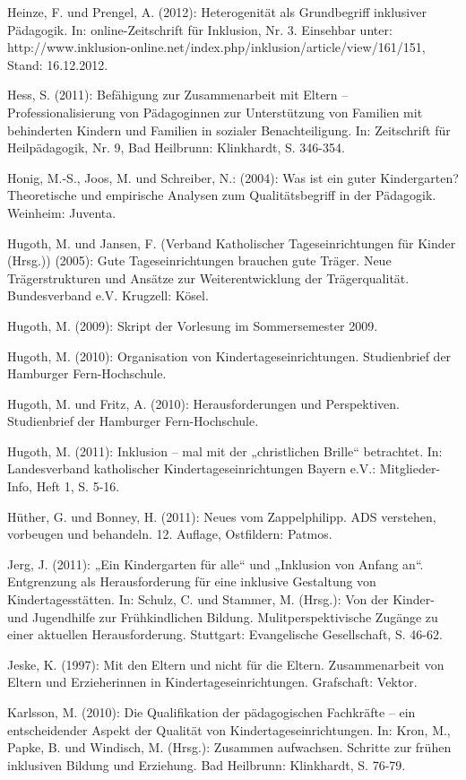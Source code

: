 Heinze, F. und Prengel, A. (2012): Heterogenität als Grundbegriff inklusiver Pädagogik. In: online-Zeitschrift für Inklusion, Nr. 3. Einsehbar unter: http://www.inklusion-online.net/index.php/inklusion/article/view/161/151, Stand: 16.12.2012.


Hess, S. (2011): Befähigung zur Zusammenarbeit mit Eltern -- Professionalisierung von Pädagoginnen zur Unterstützung von Familien mit behinderten Kindern und Familien in sozialer Benachteiligung. In: Zeitschrift für Heilpädagogik, Nr. 9, Bad Heilbrunn: Klinkhardt, S. 346-354.  

Honig, M.-S., Joos, M. und Schreiber, N.: (2004): Was ist ein guter Kindergarten? Theoretische und empirische Analysen zum Qualitätsbegriff in der Pädagogik. Weinheim: Juventa.

Hugoth, M. und Jansen, F. (Verband Katholischer Tageseinrichtungen für Kinder (Hrsg.)) (2005): Gute Tageseinrichtungen brauchen gute Träger. Neue Trägerstrukturen und Ansätze zur Weiterentwicklung der Trägerqualität. Bundesverband e.V. Krugzell: Kösel.

Hugoth, M. (2009): Skript der Vorlesung im Sommersemester 2009. 

Hugoth, M. (2010): Organisation von Kindertageseinrichtungen. Studienbrief der Hamburger Fern-Hochschule.

Hugoth, M. und Fritz, A. (2010): Herausforderungen und Perspektiven. Studienbrief der Hamburger Fern-Hochschule.

Hugoth, M. (2011): Inklusion – mal mit der „christlichen Brille“ betrachtet. In: Landesverband katholischer Kindertageseinrichtungen Bayern e.V.: Mitglieder-Info, Heft 1, S. 5-16.

Hüther, G. und Bonney, H. (2011): Neues vom Zappelphilipp. ADS verstehen, vorbeugen und behandeln. 12. Auflage, Ostfildern: Patmos.

Jerg, J. (2011): „Ein Kindergarten für alle“ und „Inklusion von Anfang an“. Entgrenzung als Herausforderung für eine inklusive Gestaltung von Kindertagesstätten. In: Schulz, C. und Stammer, M. (Hrsg.): Von der Kinder- und Jugendhilfe zur Frühkindlichen Bildung. Mulitperspektivische Zugänge zu einer aktuellen Herausforderung. Stuttgart: Evangelische Gesellschaft, S. 46-62. 

Jeske, K. (1997): Mit den Eltern und nicht für die Eltern. Zusammenarbeit von Eltern und Erzieherinnen in Kindertageseinrichtungen. Grafschaft: Vektor.

Karlsson, M. (2010): Die Qualifikation der pädagogischen Fachkräfte -- ein entscheidender Aspekt der Qualität von Kindertageseinrichtungen. In: Kron, M., Papke, B. und Windisch, M. (Hrsg.): Zusammen aufwachsen. Schritte zur frühen inklusiven Bildung und Erziehung. Bad Heilbrunn: Klinkhardt, S. 76-79. 

